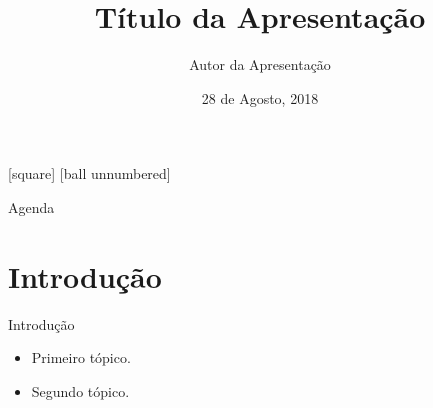 \documentclass{beamer}
\title{Título da Apresentação}
\author{Autor da Apresentação}
\date{28 de Agosto, 2018}
\institute
{
  Universidade Federal do Rio de Janeiro\\
  DEE/UFRJ
}
\begin{document}
{
\begin{frame}
  \bigskip\bigskip\bigskip\bigskip
  \titlepage
\end{frame}
}

[square]
[ball unnumbered]
\begin{frame}{Agenda}
  \tableofcontents
\end{frame}

\section{Introdução}

\begin{frame}{Introdução}
  \begin{itemize}
  \item {
    Primeiro tópico.
    \pause
  }
  \item {
    Segundo tópico.
  }
  \end{itemize}
\end{frame}
\end{document}
